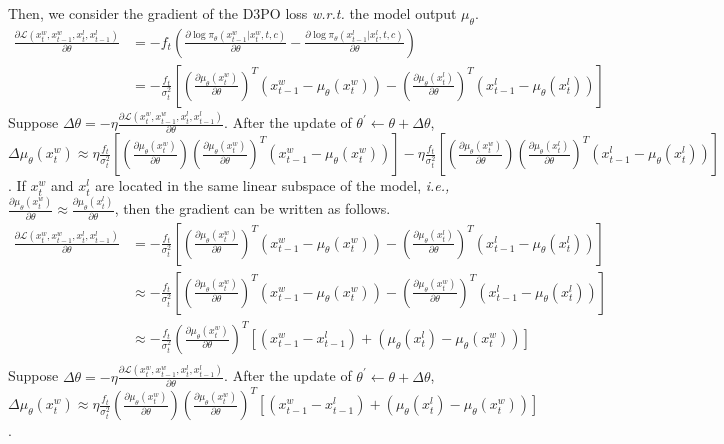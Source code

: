 Then, we consider the gradient of the D3PO loss \emph{w.r.t.} the model output $\mu_\theta$.
\begin{equation}
\begin{aligned}
    \frac{\partial\mathcal{L}(x^w_t,x_{t-1}^w, x^l_t, x_{t-1}^l)}{\partial \theta}
    & = -f_t(\frac{\partial\log\pi_\theta(x^w_{t-1}|x^w_t,t,c)}{\partial \theta} - \frac{\partial\log\pi_\theta(x^l_{t-1}|x^l_t,t,c)}{\partial \theta}) \\
    & = -\frac{f_t}{\sigma_t^2}\left[(\frac{\partial\mu_\theta(x^w_t)}{\partial \theta})^T(x^w_{t-1}-\mu_\theta(x^w_t)) - (\frac{\partial \mu_\theta(x^l_t)}{\partial\theta})^T(x^l_{t-1}-\mu_\theta(x^l_t))\right]
\end{aligned}
\end{equation}
Suppose $\Delta\theta=-\eta\frac{\partial\mathcal{L}(x^w_t,x^w_{t-1},x^l_t,x^l_{t-1})}{\partial\theta}$.
After the update of $\theta^\prime\leftarrow\theta+\Delta\theta$, 
$\Delta \mu_\theta(x^w_t)\approx\eta\frac{f_t}{\sigma_t^2}[(\frac{\partial\mu_\theta(x^w_t)}{\partial \theta})(\frac{\partial\mu_\theta(x^w_t)}{\partial \theta})^T (x^w_{t-1}-\mu_\theta(x^w_t))] - \eta\frac{f_t}{\sigma_t^2}[(\frac{\partial\mu_\theta(x^w_t)}{\partial\theta})(\frac{\partial\mu_\theta(x^l_t)}{\partial\theta})^T (x^l_{t-1}-\mu_\theta(x^l_t))]$.
If $x^w_{t}$ and $x^l_{t}$ are located in the same linear subspace of the model, \emph{i.e.,} $\frac{\partial\mu_\theta(x^w_t)}{\partial\theta}\approx \frac{\partial\mu_\theta(x^l_t)}{\partial\theta}$, 
then the gradient can be written as follows.
\begin{equation}
\begin{aligned}
    \frac{\partial\mathcal{L}(x^w_t,x_{t-1}^w, x^l_t, x_{t-1}^l)}{\partial \theta}
    & = -\frac{f_t}{\sigma_t^2}\left[(\frac{\partial\mu_\theta(x^w_t)}{\partial \theta})^T(x^w_{t-1}-\mu_\theta(x^w_t)) - (\frac{\partial \mu_\theta(x^l_t)}{\partial\theta})^T(x^l_{t-1}-\mu_\theta(x^l_t))\right] \\
    & \approx -\frac{f_t}{\sigma_t^2}\left[(\frac{\partial\mu_\theta(x^w_t)}{\partial \theta})^T(x^w_{t-1}-\mu_\theta(x^w_t)) - (\frac{\partial \mu_\theta(x^w_t)}{\partial\theta})^T(x^l_{t-1}-\mu_\theta(x^l_t))\right] \\
    & \approx -\frac{f_t}{\sigma_t^2}(\frac{\partial\mu_\theta(x^w_t)}{\partial \theta})^T\left[(x^w_{t-1}-x^l_{t-1}) + (\mu_\theta(x^l_t) - \mu_\theta(x^w_t))\right] \\
\end{aligned}
\end{equation}
Suppose $\Delta\theta=-\eta\frac{\partial\mathcal{L}(x^w_t,x^w_{t-1},x^l_t,x^l_{t-1})}{\partial\theta}$.
After the update of $\theta^\prime\leftarrow\theta+\Delta\theta$, 
$\Delta\mu_\theta(x^w_t)\approx \eta\frac{f_t}{\sigma^2_t} (\frac{\partial\mu_\theta(x^w_t)}{\partial\theta})(\frac{\partial\mu_\theta(x^w_t)}{\partial\theta})^T[(x^w_{t-1}-x^l_{t-1}) + (\mu_\theta(x^l_t)-\mu_\theta(x^w_t))]$.

